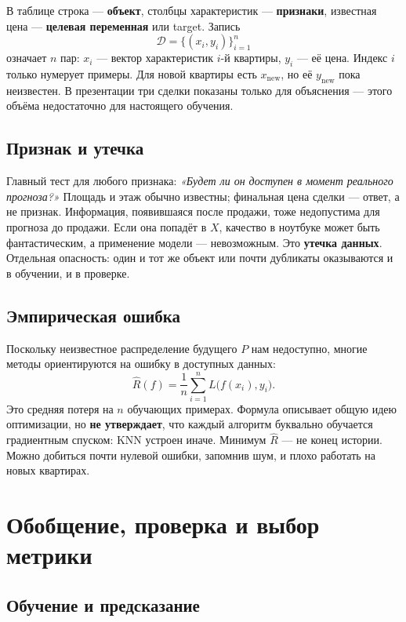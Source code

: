 \documentclass[11pt,a4paper]{article}
\newcommand{\term}[1]{\textbf{\color{navy}#1}}
\begin{document}
В таблице строка --- \term{объект}, столбцы характеристик --- \term{признаки}, известная цена --- \term{целевая переменная} или target. Запись
\[
\mathcal D=\{(x_i,y_i)\}_{i=1}^{n}
\]
означает $n$ пар: $x_i$ --- вектор характеристик $i$-й квартиры, $y_i$ --- её цена. Индекс $i$ только нумерует примеры. Для новой квартиры есть $x_\mathrm{new}$, но её $y_\mathrm{new}$ пока неизвестен. В презентации три сделки показаны только для объяснения --- этого объёма недостаточно для настоящего обучения.

\subsection{Признак и утечка}

Главный тест для любого признака: \emph{«Будет ли он доступен в момент реального прогноза?»} Площадь и этаж обычно известны; финальная цена сделки --- ответ, а не признак. Информация, появившаяся после продажи, тоже недопустима для прогноза до продажи. Если она попадёт в $X$, качество в ноутбуке может быть фантастическим, а применение модели --- невозможным. Это \term{утечка данных}. Отдельная опасность: один и тот же объект или почти дубликаты оказываются и в обучении, и в проверке.

\subsection{Эмпирическая ошибка}

Поскольку неизвестное распределение будущего $P$ нам недоступно, многие методы ориентируются на ошибку в доступных данных:
\[
\hat R(f)=\frac{1}{n}\sum_{i=1}^{n} L\bigl(f(x_i),y_i\bigr).
\]
Это средняя потеря на $n$ обучающих примерах. Формула описывает общую идею оптимизации, но \textbf{не утверждает}, что каждый алгоритм буквально обучается градиентным спуском: KNN устроен иначе. Минимум $\hat R$ --- не конец истории. Можно добиться почти нулевой ошибки, запомнив шум, и плохо работать на новых квартирах.

\section{Обобщение, проверка и выбор метрики}



\subsection{Обучение и предсказание}
\end{document}
